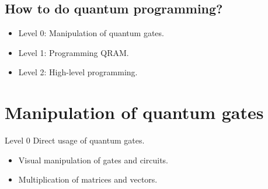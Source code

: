 \documentclass{beamer}
\begin{document}
\subsection{How to do quantum programming?}

\begin{frame}{\insertsection}{\insertsubsection}

  \begin{itemize}
    \item<1-> Level 0: Manipulation of quantum gates.

    \item<2-> Level 1: Programming QRAM. 

    \item<3-> Level 2: High-level programming. 
  \end{itemize}
\end{frame}

\section{Manipulation of quantum gates}

\begin{frame}
    \begin{center}
        {\color{iitis-orange} \LARGE \insertsection}
    \end{center}
\end{frame}

\begin{frame}{\insertsection}{\insertsubsection}
\begin{block}{Level 0}
    Direct usage of quantum gates.
\end{block}
\begin{itemize}
    \item Visual manipulation of gates and circuits.
    \item Multiplication of matrices and vectors.
\end{itemize}
\end{frame}
\end{document}
